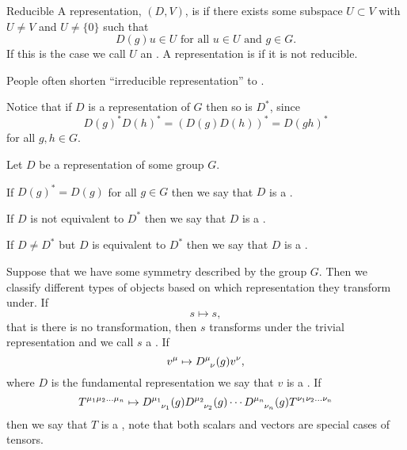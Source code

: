 \documentclass[fleqn]{NotesClass}
\begin{document}
    \begin{dfn}{Reducible}{}
        A representation, \((D, V)\), is  if there exists some subspace \(U \subset V\) with \(U \ne V\) and \(U \ne \{0\}\) such that
        \begin{equation}
            D(g) u \in U \text{ for all } u \in U \text{ and } g \in G.
        \end{equation}
        If this is the case we call \(U\) an .
        A representation is  if it is not reducible.
    \end{dfn}
    
    \begin{ntn}{}{}
        People often shorten \enquote{irreducible representation} to .
    \end{ntn}
    
    Notice that if \(D\) is a representation of \(G\) then so is \(D^*\), since
    \begin{equation}
        D(g)^*D(h)^* = (D(g)D(h))^* = D(gh)^*
    \end{equation}
    for all \(g, h \in G\).
    
    \begin{dfn}{}{}
        Let \(D\) be a representation of some group \(G\).
        
        If \(D(g)^* = D(g)\) for all \(g \in G\) then we say that \(D\) is a .
        
        If \(D\) is not equivalent to \(D^*\) then we say that \(D\) is a .
        
        If \(D \ne D^*\) but \(D\) is equivalent to \(D^*\) then we say that \(D\) is a .
    \end{dfn}
    
    Suppose that we have some symmetry described by the group \(G\).
    Then we classify different types of objects based on which representation they transform under.
    If
    \begin{equation}
        s \mapsto s,
    \end{equation}
    that is there is no transformation, then \(s\) transforms under the trivial representation and we call \(s\) a .
    If
    \begin{equation}
        v^\mu \mapsto \tensor{D}{^\mu_\nu}(g)v^\nu,
    \end{equation}
    where \(D\) is the fundamental representation we say that \(v\) is a .
    If
    \begin{equation}
        T^{\mu_1\mu_2\dots \mu_n} \mapsto \tensor{D}{^{\mu_1}_{\nu_1}}(g) \tensor{D}{^{\mu_2}_{\nu_2}}(g) \dotsm \tensor{D}{^{\mu_n}_{\nu_n}}(g) T^{\nu_1\nu_2 \dots \nu_n}
    \end{equation}
    then we say that \(T\) is a , note that both scalars and vectors are special cases of tensors.
    
\end{document}

